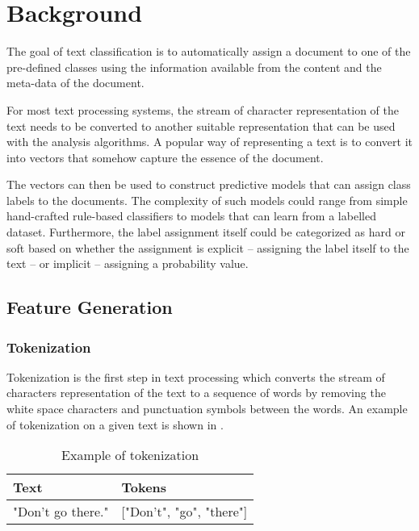 \chapter{Background} \label{background}
The goal of text classification is to automatically assign a document to one of the pre-defined classes using the information available from the content and the meta-data of the document.

For most text processing systems, the stream of character representation of the text needs to be converted to another suitable representation that can be used with the analysis algorithms. A popular way of representing a text is to convert it into vectors that somehow capture the essence of the document. 

The vectors can then be used to construct predictive models that can assign class labels to the documents. The complexity of such models could range from simple hand-crafted rule-based classifiers to models that can learn from a labelled dataset. Furthermore, the label assignment itself could be categorized as hard or soft based on whether the assignment is explicit -- assigning the label itself to the text -- or implicit -- assigning a probability value. 

\section{Feature Generation}
\subsection{Tokenization}
Tokenization is the first step in text processing which converts the stream of characters representation of the text to a sequence of words by removing the white space characters and punctuation symbols between the words. An example of tokenization on a given text is shown in .

\begin{table}[h]
\begin{center}
\caption{Example of tokenization}
\label{tbl:tokenization_example}
\begin{tabular}{p{6cm}p{6cm}}
\toprule 
Text&Tokens\\
\midrule 
"Don't go there."&["Don't", "go", "there"]\\
\bottomrule
\end{tabular}
\end{center}
\end{table}

